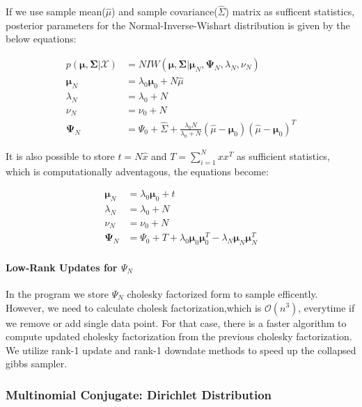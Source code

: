 \documentclass[a4paper]{article}
\begin{document}
If we use sample mean(\(\hat{\mu}\)) and sample
covariance(\(\hat{\Sigma}\)) matrix as sufficent statistics, posterior
parameters for the Normal-Inverse-Wishart distribution is given by the
below equations\cite{kamper2013gibbs}:

\begin{align*}
p(\boldsymbol\mu,\boldsymbol\Sigma|\mathcal{X}) & = NIW(\boldsymbol\mu,\boldsymbol\Sigma| \boldsymbol  \mu_N,  \boldsymbol  \Psi_N, \lambda_N, \nu_N)  \\
\boldsymbol \mu_N & = \lambda_0 \boldsymbol \mu_0 + N \hat{\mu} \\
\lambda_N & = \lambda_0 + N \\
\nu_N & = \nu_0 + N \\
\boldsymbol \Psi_N &=  \Psi_0 + \hat{\Sigma} + \frac{\lambda_0N}{\lambda_0+N}(\hat{\mu}-\boldsymbol \mu_0)(\hat{\mu}-\boldsymbol \mu_0)^T
\end{align*}

It is also possible to store \(t =N\hat{x}\) and \(T=\sum_{i=1}^Nxx^T\)
as sufficient statistics, which is computationally adventagous, the
equations become:

\begin{align*}
\boldsymbol \mu_N & = \lambda_0 \boldsymbol \mu_0 + t \\
\lambda_N & = \lambda_0 + N \\
\nu_N & = \nu_0 + N \\
\boldsymbol \Psi_N &=  \Psi_0 + T + \lambda_0\boldsymbol\mu_0\boldsymbol\mu_0^T-\lambda_N\boldsymbol\mu_N\boldsymbol\mu_N ^T
\end{align*}


\paragraph{\texorpdfstring{Low-Rank Updates for
\(\Psi_N\)}{Low-Rank Updates for \textbackslash Psi\_N}}

In the program we store \(\Psi_N\) cholesky factorized form to sample
efficently. However, we need to calculate cholesk factorization,which is
$\mathcal{O}(n^3)$, everytime if we remove or add single data point.
For that case, there is a faster algorithm to compute updated cholesky
factorization from the previous cholesky factorization\cite{Seeger:161468}. We utilize rank-1
update and rank-1 downdate methods to speed up the collapsed gibbs
sampler.


\subsubsection{Multinomial Conjugate: Dirichlet Distribution}
\end{document}
